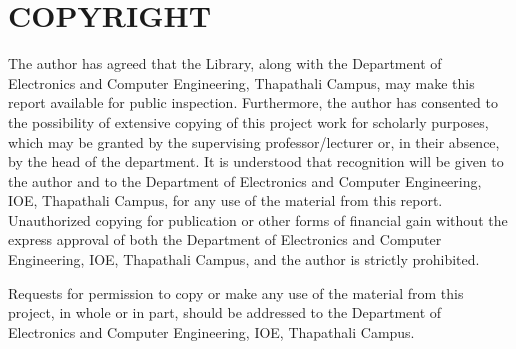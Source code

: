 \section*{COPYRIGHT}
    The author has agreed that the Library, along with the Department of Electronics and Computer Engineering, Thapathali Campus, may make this report available for public inspection. Furthermore, the author has consented to the possibility of extensive copying of this project work for scholarly purposes, which may be granted by the supervising professor/lecturer or, in their absence, by the head of the department. It is understood that recognition will be given to the author and to the Department of Electronics and Computer Engineering, IOE, Thapathali Campus, for any use of the material from this report. Unauthorized copying for publication or other forms of financial gain without the express approval of both the Department of Electronics and Computer Engineering, IOE, Thapathali Campus, and the author is strictly prohibited.

    Requests for permission to copy or make any use of the material from this project, in whole or in part, should be addressed to the Department of Electronics and Computer Engineering, IOE, Thapathali Campus.



